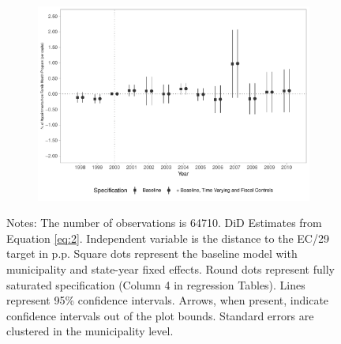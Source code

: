 \begin{figure}[h!]
\begin{center}
\begin{subfigure}{0.32\textwidth}
        \includegraphics[width=\textwidth]{plots/siab_cons_especif_psf_pcapita_dist_ec29_baseline_dist_ec29_baseline_12.pdf}
    \end{subfigure}
    
    \end{center}
    
            \scriptsize{Notes: The number of observations is 64710. DiD Estimates from Equation \ref{eq:2}. Independent variable is the distance to the EC/29 target in p.p. Square dots represent the baseline model with municipality and state-year fixed effects. Round dots represent fully saturated specification (Column 4 in regression Tables). Lines represent 95\% confidence intervals. Arrows, when present, indicate confidence intervals out of the plot bounds. Standard errors are clustered in the municipality level.}
    
\end{figure}
